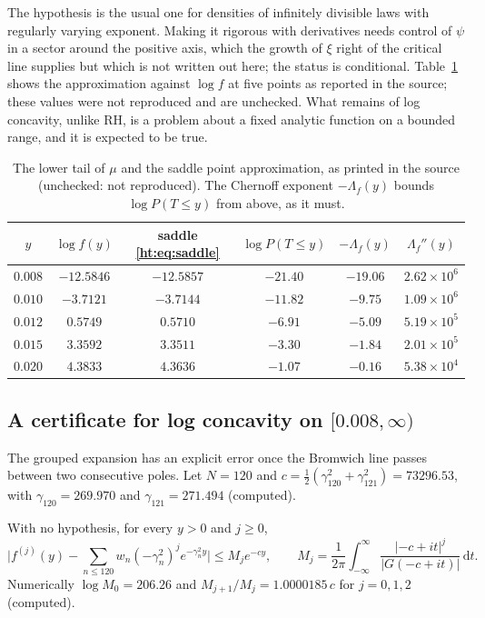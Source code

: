 The hypothesis is the usual one for densities of infinitely divisible laws with regularly varying exponent. Making it rigorous with derivatives needs control of $\psi$ in a sector around the positive axis, which the growth of $\xi$ right of the critical line supplies but which is not written out here; the status is conditional. Table~\ref{ht:tab:saddle} shows the approximation against $\log f$ at five points as reported in the source; these values were not reproduced and are unchecked. What remains of log concavity, unlike RH, is a problem about a fixed analytic function on a bounded range, and it is expected to be true.

\begin{table}[ht]
\centering\small
\begin{tabular}{cccccc}
\toprule
$y$ & $\log f(y)$ & saddle \eqref{ht:eq:saddle} & $\log P(T\le y)$ & $-\Lambda_f(y)$ & $\Lambda_f''(y)$\\
\midrule
$0.008$ & $-12.5846$ & $-12.5857$ & $-21.40$ & $-19.06$ & $2.62\times10^6$\\
$0.010$ & $-3.7121$ & $-3.7144$ & $-11.82$ & $-9.75$ & $1.09\times10^6$\\
$0.012$ & $0.5749$ & $0.5710$ & $-6.91$ & $-5.09$ & $5.19\times10^5$\\
$0.015$ & $3.3592$ & $3.3511$ & $-3.30$ & $-1.84$ & $2.01\times10^5$\\
$0.020$ & $4.3833$ & $4.3636$ & $-1.07$ & $-0.16$ & $5.38\times10^4$\\
\bottomrule
\end{tabular}
\caption{The lower tail of $\mu$ and the saddle point approximation, as printed in the source (unchecked: not reproduced). The Chernoff exponent $-\Lambda_f(y)$ bounds $\log P(T\le y)$ from above, as it must.}\label{ht:tab:saddle}
\end{table}

\subsection{A certificate for log concavity on $[0.008,\infty)$}

The grouped expansion has an explicit error once the Bromwich line passes between two consecutive poles. Let $N=120$ and $c=\frac12(\gamma_{120}^2+\gamma_{121}^2)=73296.53$, with $\gamma_{120}=269.970$ and $\gamma_{121}=271.494$ (computed).

\begin{proposition}\label{ht:prop:explicit}
With no hypothesis, for every $y>0$ and $j\ge0$,
\[
\Big|f^{(j)}(y)-\sum_{n\le120}w_n(-\gamma_n^2)^je^{-\gamma_n^2y}\Big|\le M_je^{-cy},\qquad M_j=\frac1{2\pi}\int_{-\infty}^\infty\frac{|{-c}+it|^j}{|G(-c+it)|}\,\mathrm{d}t .
\]
Numerically $\log M_0=206.26$ and $M_{j+1}/M_j=1.0000185\,c$ for $j=0,1,2$ (computed).
\end{proposition}

